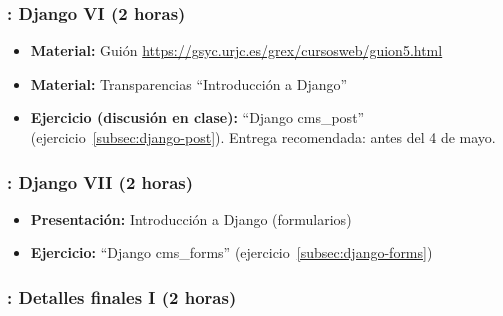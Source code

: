 \documentclass[a4paper,12pt]{article}
\begin{document}
\subsubsection{\lunesK: Django VI (2 horas)}
\label{cal:lunesK}

\begin{itemize}

 \item \textbf{Material:} Guión \url{https://gsyc.urjc.es/grex/cursosweb/guion5.html}
 \item \textbf{Material:} Transparencias ``Introducción a Django''
 \item \textbf{Ejercicio (discusión en clase):} ``Django cms\_post'' (ejercicio~\ref{subsec:django-post}).
  Entrega recomendada: antes del 4 de mayo.
\end{itemize}

\subsubsection{\lunesL: Django VII (2 horas)}
\label{cal:lunesL}

\begin{itemize}
  \item \textbf{Presentación:} Introducción a Django (formularios)
  \item \textbf{Ejercicio:} ``Django cms\_forms'' (ejercicio~\ref{subsec:django-forms}) \\
\end{itemize}



 \subsubsection{\juevesX: Detalles finales I  (2 horas)}
 \label{cal:juevesO}
\end{document}
